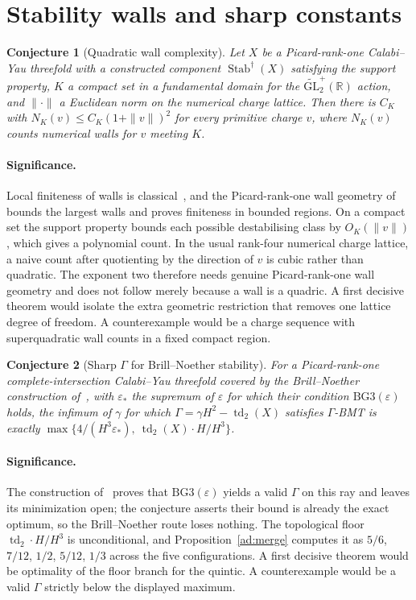 \documentclass[11pt]{article}
\newtheorem{conjecture}{Conjecture}
\theoremstyle{definition}
\begin{document}
\section{Stability walls and sharp constants}

\begin{conjecture}[Quadratic wall complexity]\label{ad10}
Let $X$ be a Picard-rank-one Calabi--Yau threefold with a constructed component $\operatorname{Stab}^\dagger(X)$ satisfying the support property, $K$ a compact set in a fundamental domain for the $\widetilde{\mathrm{GL}}_2^+(\mathbb R)$ action, and $\|\cdot\|$ a Euclidean norm on the numerical charge lattice.  Then there is $C_K$ with $N_K(v)\le C_K(1+\|v\|)^2$ for every primitive charge $v$, where $N_K(v)$ counts numerical walls for $v$ meeting $K$.
\end{conjecture}

\paragraph{Significance.}
Local finiteness of walls is classical~\cite{BM22}, and the Picard-rank-one wall geometry of~\cite{JM19} bounds the largest walls and proves finiteness in bounded regions.  On a compact set the support property bounds each possible destabilising class by $O_K(\|v\|)$, which gives a polynomial count.  In the usual rank-four numerical charge lattice, a naive count after quotienting by the direction of $v$ is cubic rather than quadratic.  The exponent two therefore needs genuine Picard-rank-one wall geometry and does not follow merely because a wall is a quadric.  A first decisive theorem would isolate the extra geometric restriction that removes one lattice degree of freedom.  A counterexample would be a charge sequence with superquadratic wall counts in a fixed compact region.

\begin{conjecture}[Sharp $\Gamma$ for Brill--Noether stability]\label{ad11}
For a Picard-rank-one complete-intersection Calabi--Yau threefold covered by the Brill--Noether construction of~\cite{FKLR25}, with $\varepsilon_*$ the supremum of $\varepsilon$ for which their condition $\mathrm{BG3}(\varepsilon)$ holds, the infimum of $\gamma$ for which $\Gamma=\gamma H^2-\operatorname{td}_2(X)$ satisfies $\Gamma$-BMT is exactly $\max\{4/(H^3\varepsilon_*),\ \operatorname{td}_2(X)\cdot H/H^3\}$.
\end{conjecture}

\paragraph{Significance.}
The construction of~\cite{FKLR25} proves that $\mathrm{BG3}(\varepsilon)$ yields a valid $\Gamma$ on this ray and leaves its minimization open; the conjecture asserts their bound is already the exact optimum, so the Brill--Noether route loses nothing.  The topological floor $\operatorname{td}_2\cdot H/H^3$ is unconditional, and Proposition~\ref{ad:merge} computes it as $5/6$, $7/12$, $1/2$, $5/12$, $1/3$ across the five configurations.  A first decisive theorem would be optimality of the floor branch for the quintic.  A counterexample would be a valid $\Gamma$ strictly below the displayed maximum.
\end{document}
